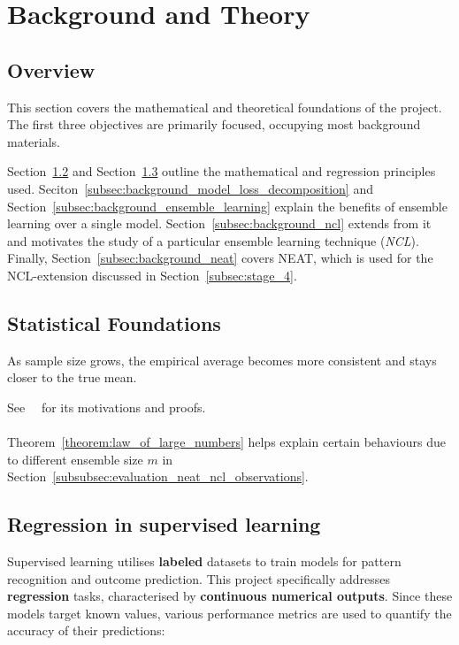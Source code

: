 \section{Background and Theory}
\label{sec:background}


\subsection{Overview}
\label{subsec:background_overview}
This section covers the mathematical and theoretical foundations of the project. The first three objectives are primarily focused, occupying most background materials. 

Section~\ref{subsec:background_statistic} and Section~\ref{subsec:background_regression} outline the mathematical and regression principles used. Seciton~\ref{subsec:background_model_loss_decomposition} and Section~\ref{subsec:background_ensemble_learning} explain the benefits of ensemble learning over a single model. Section~\ref{subsec:background_ncl} extends from it and motivates the study of a particular ensemble learning technique (\textit{NCL}). Finally, Section~\ref{subsec:background_neat} covers NEAT, which is used for the NCL-extension discussed in Section~\ref{subsec:stage_4}. 


\subsection{Statistical Foundations}
\label{subsec:background_statistic}
\begin{theorem}\label{theorem:law_of_large_numbers}
    As sample size grows, the empirical average becomes more consistent and stays closer to the true mean. 
\end{theorem}
See~\cite{durrett2019probability}~\cite{judd1985law} for its motivations and proofs. 
\\
\\
Theorem~\ref{theorem:law_of_large_numbers} helps explain certain behaviours due to different ensemble size $m$ in Section~\ref{subsubsec:evaluation_neat_ncl_observations}. 


\subsection{Regression in supervised learning}
\label{subsec:background_regression}
Supervised learning utilises \textbf{labeled} datasets to train models for pattern recognition and outcome prediction. This project specifically addresses \textbf{regression} tasks, characterised by \textbf{continuous numerical outputs}. Since these models target known values, various performance metrics are used to quantify the accuracy of their predictions: 


